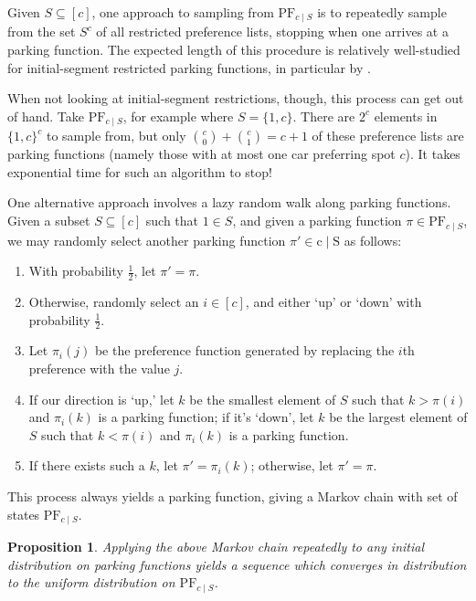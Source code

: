 \documentclass[12 pt]{amsart}
\newtheorem{proposition}[theorem]{Proposition}
\theoremstyle{definition} %
\theoremstyle{remark} %
\begin{document}
Given $S\subseteq [c]$, one approach to sampling from $\mathrm{PF}_{c\mid S}$ is to repeatedly sample from the set $S^c$ of all restricted preference lists, stopping when one arrives at a parking function. The expected length of this procedure is relatively well-studied for initial-segment restricted parking functions, in particular by \cite{spencer-yan-1999}. 


When not looking at initial-segment restrictions, though, this process can get out of hand. Take $\mathrm{PF}_{c\mid S}$, for example where $S=\{1,c\}$. There are $2^c$ elements in $\{1,c\}^c$ to sample from, but only $\binom{c}{0}+\binom{c}{1}=c+1$ of these preference lists are parking functions (namely those with at most one car preferring spot $c$). It takes exponential time for such an algorithm to stop!

One alternative approach involves a lazy random walk along parking functions. Given a subset $S\subseteq[c]$ such that $1\in S$, and given a parking function $\pi\in\mathrm{PF}_{c\mid S}$, we may randomly select another parking function $\pi'\in\mathrm{c\mid S}$ as follows:

\begin{enumerate}
    \item With probability $\frac{1}{2}$, let $\pi'=\pi$.
    \item Otherwise, randomly select an $i\in[c]$, and either `up' or `down' with probability $\frac{1}{2}$.
    \item Let $\pi_i(j)$ be the preference function generated by replacing the $i$th preference with the value $j$.
    \item If our direction is `up,' let $k$ be the smallest element of $S$ such that $k>\pi(i)$ and $\pi_i(k)$ is a parking function; if it's `down', let $k$ be the largest element of $S$ such that $k<\pi(i)$ and $\pi_i(k)$ is a parking function.
    \item If there exists such a $k$, let $\pi'=\pi_i(k)$; otherwise, let $\pi'=\pi$.
\end{enumerate}

This process always yields a parking function, giving a Markov chain with set of states $\mathrm{PF}_{c\mid S}$.

\begin{proposition}
    Applying the above Markov chain repeatedly to any initial distribution on parking functions yields a sequence which converges in distribution to the uniform distribution on $\mathrm{PF}_{c\mid S}$.
\end{proposition}
\end{document}
